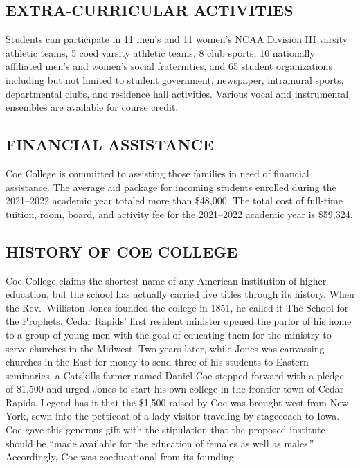 \documentclass[
  letterpaper,
]{scrbook}
\begin{document}
\hypertarget{extra-curricular-activities}{%
\subsection{EXTRA-CURRICULAR
ACTIVITIES}\label{extra-curricular-activities}}

Students can participate in 11 men's and 11 women's NCAA Division III
varsity athletic teams, 5 coed varsity athletic teams, 8 club sports, 10
nationally affiliated men's and women's social fraternities, and 65
student organizations including but not limited to student government,
newspaper, intramural sports, departmental clubs, and residence hall
activities. Various vocal and instrumental ensembles are available for
course credit.

\hypertarget{financial-assistance}{%
\subsection{FINANCIAL ASSISTANCE}\label{financial-assistance}}

Coe College is committed to assisting those families in need of
financial assistance. The average aid package for incoming students
enrolled during the 2021--2022 academic year totaled more than \$48,000.
The total cost of full-time tuition, room, board, and activity fee for
the 2021--2022 academic year is \$59,324.

\hypertarget{sec-history-of-coe-college}{%
\subsection{HISTORY OF COE COLLEGE}\label{sec-history-of-coe-college}}

Coe College claims the shortest name of any American institution of
higher education, but the school has actually carried five titles
through its history. When the Rev.~Williston Jones founded the college
in 1851, he called it The School for the Prophets. Cedar Rapids' first
resident minister opened the parlor of his home to a group of young men
with the goal of educating them for the ministry to serve churches in
the Midwest. Two years later, while Jones was canvassing churches in the
East for money to send three of his students to Eastern seminaries, a
Catskills farmer named Daniel Coe stepped forward with a pledge of
\$1,500 and urged Jones to start his own college in the frontier town of
Cedar Rapids. Legend has it that the \$1,500 raised by Coe was brought
west from New York, sewn into the petticoat of a lady visitor traveling
by stagecoach to Iowa. Coe gave this generous gift with the stipulation
that the proposed institute should be ``made available for the education
of females as well as males.'' Accordingly, Coe was coeducational from
its founding.
\end{document}
